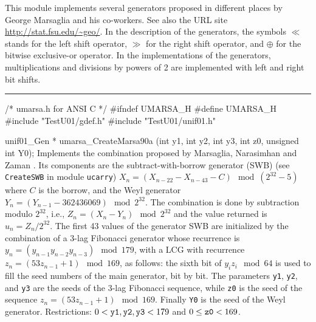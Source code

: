 
This module implements several generators proposed in different places
by George Marsaglia and his  co-workers.
See also the URL site \url{http://stat.fsu.edu/~geo/}.
In the description of the generators, the symbols $\ll$ stands for
 the left shift operator, $\gg$ for the right shift operator,
 and  $\oplus$ for the bitwise exclusive-or operator. In the
implementations of the generators, multiplications and divisions by powers
of 2 are implemented with left and right bit shifts.

\def\OP{\mathop {S}\nolimits}

\bigskip
\hrule
\code\hide
/* umarsa.h for ANSI C */
#ifndef UMARSA_H
#define UMARSA_H
\endhide
#include "TestU01/gdef.h"
#include "TestU01/unif01.h"


unif01_Gen * umarsa_CreateMarsa90a (int y1, int y2, int y3, int z0,
                                    unsigned int Y0);
\endcode
  \tab Implements the combination proposed by Marsaglia, Narasimhan and
   Zaman \cite{rMAR90a}. Its components are the subtract-with-borrow
%
   generator (SWB) (see {\tt CreateSWB} in module {\tt ucarry})
   $X_n = (X_{n-22} - X_{n-43} - C) \mod (2^{32}-5)$
   where $C$ is the borrow, and the Weyl generator
   $Y_n = (Y_{n-1} - 362436069) \mod 2^{32}$.
   The combination is done by subtraction modulo $2^{32}$, i.e.,
   $Z_n = (X_n - Y_n) \mod 2^{32}$ and the value returned is
   $u_n = Z_n/2^{32}$.
   The first 43 values of the generator SWB are initialized by the
   combination of a 3-lag Fibonacci generator whose recurrence is
   $y_n = (y_{n-1}y_{n-2}y_{n-3}) \mod 179$, with a LCG with recurrence
   $z_n = (53z_{n-1} + 1) \mod 169$, as
   follows: the sixth bit of $y_i z_i \mod 64$ is used to fill the seed
   numbers of the main generator, bit by bit.
   The parameters {\tt y1}, {\tt y2},  and {\tt y3} are the seeds of the
    3-lag Fibonacci sequence, while {\tt z0} is the seed of the
   sequence $z_{n} = (53 z_{n-1} + 1)\mod 169$.  Finally {\tt Y0}
   is the seed of the  Weyl generator.  Restrictions: $0 < {\tt y1},
   {\tt y2}, {\tt y3} < 179$ and $0 \le {\tt z0} < 169$.
  \endtab
\code



